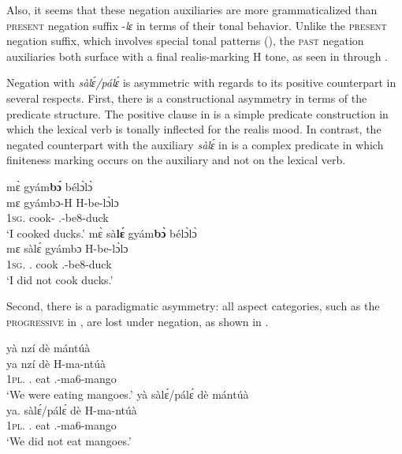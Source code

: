 Also, it seems that these negation auxiliaries are more grammaticalized than \textsc{present} negation suffix -{\itshape lɛ} in terms of their tonal behavior. Unlike the \textsc{present} negation suffix, which involves special tonal patterns    (), the \textsc{past} negation auxiliaries both surface with a final realis-marking H tone, as seen in  through .

Negation with {\itshape sàlɛ́/pálɛ́} is asymmetric with regards to its positive counterpart in several respects. First, there is a constructional asymmetry in terms of the predicate structure. The positive clause in  is a simple predicate construction in which the lexical verb is tonally inflected for the realis mood. In contrast, the negated counterpart with the auxiliary {\itshape sàlɛ́} in  is a complex predicate in which finiteness marking occurs on the auxiliary and not on the lexical verb.

\ea\label{pale3}
\ea \label{pale3a}
  \glll     mɛ̀ gyám{\bfseries bɔ́} bélɔ̀lɔ̀  \\
          mɛ gyámbɔ-H H-be-lɔ̀lɔ \\
              1\textsc{sg}.{\PST} cook-{\R} {\OBJ}.{\LINK}-be8-duck\\
    \trans `I cooked ducks.'
\ex\label{pale3b}
  \glll     mɛ̀ sà{\bfseries lɛ́}  gyám{\bfseries bɔ̀} bélɔ̀lɔ̀  \\
            mɛ sàlɛ́  gyámbɔ H-be-lɔ̀lɔ \\
              1\textsc{sg}.{\PST} {\NEG}.{\PST} cook {\OBJ}.{\LINK}-be8-duck\\
    \trans `I did not cook ducks.'
\z
\z

Second, there is a paradigmatic asymmetry: all aspect categories, such as the \textsc{progressive} in , are lost under negation, as shown in .

\ea\label{pale4}
\ea \label{pale4a}
  \glll     yà nzí  dè mántúà  \\
          ya nzí dè H-ma-ntúà \\
              1\textsc{pl}.{\PST} {\PROG}.{\PST} eat {\OBJ}.{\LINK}-ma6-mango\\
    \trans `We were eating mangoes.'
\ex\label{pale4b}
  \glll     yà sàlɛ́/pálɛ́ dè mántúà \\
            ya.{\PST} sàlɛ́/pálɛ́ dè H-ma-ntúà \\
              1\textsc{pl}.{\PST} {\NEG}.{\PST} eat {\OBJ}.{\LINK}-ma6-mango\\
    \trans `We did not eat mangoes.'
\z
\z

